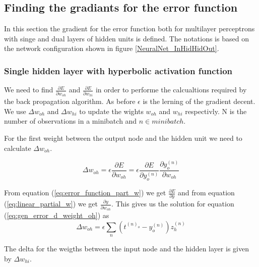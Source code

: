 \subsection{Finding the gradiants for the error function}
In this section the gradient for the error function both for multilayer perceptrons with singe and dual layers of hidden units is defined. The notations is based on the network configuration shown in figure \ref{NeuralNet_InHidHidOut}.

\subsubsection{Single hidden layer with hyperbolic activation function} \label{ch:single_hidden_layer}
We need to find $\frac{\partial{E}}{\partial{w_{oh}}}$ and $\frac{\partial{E}}{\partial{w_{hi}}}$ in order to performe the calcualtions required by the back propagation algorithm. As before $\epsilon$ is the lerning of the gradient decent. We use $\Delta w_{oh}$ and $\Delta w_{hi} $ to update the wights $w_{oh}$ and $w_{hi}$ respectivly. 
N is the number of observations in a minibatch and $n \in minibatch$.

For the first weight between the output node and the hidden unit we need to calculate $\Delta w_{oh}$.

\begin{equation} \label{eq:gen_error_d_weight_oh}
\Delta w_{oh} = \epsilon \frac{\partial{E}}{\partial{w_{oh}}} = \epsilon \frac{\partial{E}}{\partial{y^{(n)}_{o}}} \frac{\partial{y^{(n)}_{o}}}{\partial{w_{oh}}}
\end{equation}

From equation (\ref{eq:error_function_part_w}) we get $\frac{\partial{E}}{\partial{y}}$
and from equation (\ref{eq:linear_partial_w}) we get $\frac{\partial{y}}{\partial{w_{oh}}}$.
This gives us the solution for equation (\ref{eq:gen_error_d_weight_oh}) as
\begin{equation} \label{eq:gen_error_d_weight_oh_final}
\Delta w_{oh}  = \epsilon \sum_{n} (t^{(n)_{o}}-y^{(n)}_{o}) z^{(n)}_{h} 
\end{equation}

The delta for the weigths between the input node and the hidden layer is given by $\Delta w_{hi} $. 

